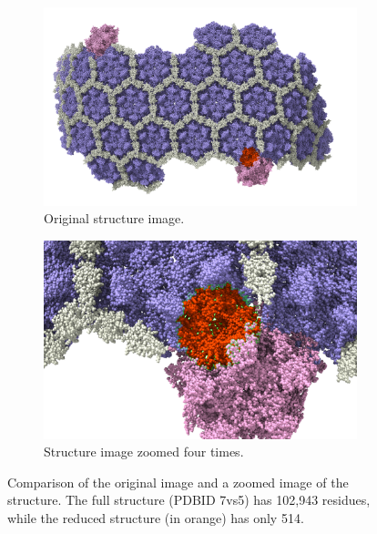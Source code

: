 \documentclass[11pt,a4paper]{article}
\begin{document}
\begin{figure}[ht]
    \centering
    \begin{subfigure}[b]{0.45\textwidth}
        \includegraphics[width=\textwidth]{Supplementary Data/Figures/Full_image.png}
        \caption{Original structure image.}
        \label{fig:full_image}
    \end{subfigure}
    \hfill
    \begin{subfigure}[b]{0.45\textwidth}
        \includegraphics[width=\textwidth]{Supplementary Data/Figures/zoom_4.png}
        \caption{Structure image zoomed four times.}
        \label{fig:zoom_4}
    \end{subfigure}
    \caption{Comparison of the original image and a zoomed image of the structure. The full structure (PDBID 7vs5) has 102,943 residues, while the reduced structure (in orange) has only 514.}
    \label{fig:comparison}
\end{figure}
\end{document}
